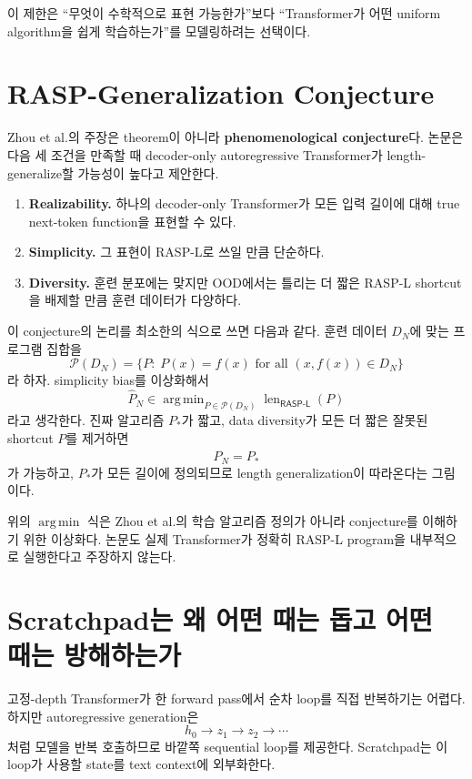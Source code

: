 \documentclass[11pt,a4paper,oneside,openany]{memoir}
\newcommand{\Raspl}{\mathsf{RASP\text{-}L}}
\DeclareMathOperator*{\argmin}{arg\,min}
\theoremstyle{definition}
\begin{document}
이 제한은 ``무엇이 수학적으로 표현 가능한가''보다 ``Transformer가 어떤 uniform algorithm을 쉽게 학습하는가''를 모델링하려는 선택이다.

\section{RASP-Generalization Conjecture}

\begin{paperbox}
Zhou et al.의 주장은 theorem이 아니라 \textbf{phenomenological conjecture}다.
논문은 다음 세 조건을 만족할 때 decoder-only autoregressive Transformer가 length-generalize할 가능성이 높다고 제안한다.
\end{paperbox}

\begin{enumerate}
\item \textbf{Realizability.} 하나의 decoder-only Transformer가 모든 입력 길이에 대해 true next-token function을 표현할 수 있다.
\item \textbf{Simplicity.} 그 표현이 RASP-L로 쓰일 만큼 단순하다.
\item \textbf{Diversity.} 훈련 분포에는 맞지만 OOD에서는 틀리는 더 짧은 RASP-L shortcut을 배제할 만큼 훈련 데이터가 다양하다.
\end{enumerate}

이 conjecture의 논리를 최소한의 식으로 쓰면 다음과 같다. 훈련 데이터 $D_N$에 맞는 프로그램 집합을
\[
\mathcal P(D_N)=\{P:\;P(x)=f(x)\text{ for all }(x,f(x))\in D_N\}
\]
라 하자. simplicity bias를 이상화해서
\[
\widehat P_N\in\argmin_{P\in\mathcal P(D_N)}\operatorname{len}_{\Raspl}(P)
\]
라고 생각한다. 진짜 알고리즘 $P_*$가 짧고, data diversity가 모든 더 짧은 잘못된 shortcut $P$를 제거하면
\[
\widehat P_N=P_*
\]
가 가능하고, $P_*$가 모든 길이에 정의되므로 length generalization이 따라온다는 그림이다.

\begin{warningbox}
위의 $\argmin$ 식은 Zhou et al.의 학습 알고리즘 정의가 아니라 conjecture를 이해하기 위한 이상화다.
논문도 실제 Transformer가 정확히 RASP-L program을 내부적으로 실행한다고 주장하지 않는다.
\end{warningbox}

\section{Scratchpad는 왜 어떤 때는 돕고 어떤 때는 방해하는가}

고정-depth Transformer가 한 forward pass에서 순차 loop를 직접 반복하기는 어렵다.
하지만 autoregressive generation은
\[
h_0\to z_1\to z_2\to\cdots
\]
처럼 모델을 반복 호출하므로 바깥쪽 sequential loop를 제공한다.
Scratchpad는 이 loop가 사용할 state를 text context에 외부화한다.
\end{document}

